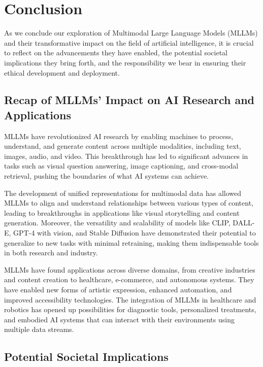 \chapter{Conclusion}

As we conclude our exploration of Multimodal Large Language Models (MLLMs) and their transformative impact on the field of artificial intelligence, it is crucial to reflect on the advancements they have enabled, the potential societal implications they bring forth, and the responsibility we bear in ensuring their ethical development and deployment.

\section{Recap of MLLMs' Impact on AI Research and Applications}

MLLMs have revolutionized AI research by enabling machines to process, understand, and generate content across multiple modalities, including text, images, audio, and video. This breakthrough has led to significant advances in tasks such as visual question answering, image captioning, and cross-modal retrieval, pushing the boundaries of what AI systems can achieve.

The development of unified representations for multimodal data has allowed MLLMs to align and understand relationships between various types of content, leading to breakthroughs in applications like visual storytelling and content generation. Moreover, the versatility and scalability of models like CLIP, DALL-E, GPT-4 with vision, and Stable Diffusion have demonstrated their potential to generalize to new tasks with minimal retraining, making them indispensable tools in both research and industry.

MLLMs have found applications across diverse domains, from creative industries and content creation to healthcare, e-commerce, and autonomous systems. They have enabled new forms of artistic expression, enhanced automation, and improved accessibility technologies. The integration of MLLMs in healthcare and robotics has opened up possibilities for diagnostic tools, personalized treatments, and embodied AI systems that can interact with their environments using multiple data streams.

\section{Potential Societal Implications}

